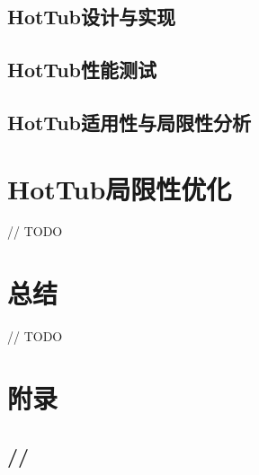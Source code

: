 \documentclass[lang=cn,12pt,a4paper,cite=authoryear]{elegantpaper}
\begin{document}
\subsection{HotTub设计与实现}

\subsection{HotTub性能测试}

\subsection{HotTub适用性与局限性分析}


\section{HotTub局限性优化}
// TODO

\section{总结}
// TODO

\nocite{*}
\cleardoublepage


\cleardoublepage
\appendix
\addappheadtotoc
\section{附录}

\subsection{//}
\end{document}
